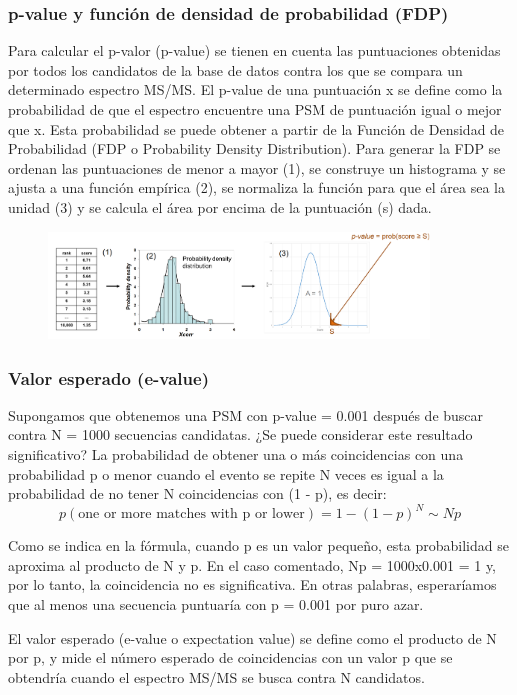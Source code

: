 \subsubsection{p-value y función de densidad de probabilidad (FDP)}
Para calcular el p-valor (p-value) se tienen en cuenta las puntuaciones obtenidas por todos los candidatos de la base de datos contra los que se compara un determinado espectro MS/MS.
El p-value de una puntuación x se define como la probabilidad de que el espectro encuentre una PSM de puntuación igual o mejor que x. Esta probabilidad se puede obtener a partir de la Función de Densidad de Probabilidad (FDP o Probability Density Distribution). Para generar la FDP se ordenan las puntuaciones de menor a mayor (1), se construye un histograma y se ajusta a una función empírica (2), se normaliza la función para que el área sea la unidad (3) y se calcula el área por encima de la puntuación (s) dada. 

\begin{figure}[h]
\centering
\includegraphics[width = 0.9\textwidth]{figs/fdp.png}
\end{figure}

\subsubsection{Valor esperado (e-value)}
Supongamos que obtenemos una PSM con p-value = 0.001 después de buscar contra N = 1000 secuencias candidatas. ¿Se puede considerar este resultado significativo?
La probabilidad de obtener una o más coincidencias con una probabilidad p o menor cuando el evento se repite N veces es igual a la probabilidad de no tener N coincidencias con (1 - p), es decir:
$$p(\text{one or more matches with p or lower}) = 1 - (1 - p)^N \sim Np$$

Como se indica en la fórmula, cuando p es un valor pequeño, esta probabilidad se aproxima al producto de N y p. En el caso comentado, Np = 1000x0.001 = 1 y, por lo tanto, la coincidencia no es significativa. En otras palabras, esperaríamos que al menos una secuencia puntuaría con p = 0.001 por puro azar.

El valor esperado (e-value o expectation value) se define como el producto de N por p, y mide el número esperado de coincidencias con un valor p que se obtendría cuando el espectro MS/MS se busca contra N candidatos.

